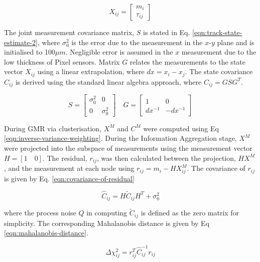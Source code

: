 \begin{equation}
X_{ij} = \begin{bmatrix} m_i \\ \tau_{ij} \end{bmatrix}
\label{eqn:track-state-estimate}
\end{equation}


The joint measurement covariance matrix, $S$ is stated in Eq. \eqref{eqn:track-state-estimate-2}, where $\sigma_0^{2}$ is the error due to the measurement in the $x$-$y$ plane and is initialised to 100$\mu m$. Negligible error is assumed in the $x$ measurement due to the low thickness of Pixel sensors. Matrix $G$ relates the measurements to the state vector $X_{ij}$ using a linear extrapolation, where $dx = x_i - x_j$. The state covariance $C_{ij}$ is derived using the standard linear algebra approach, where $C_{ij} = GSG^T$. 

\begin{equation}
S = \begin{bmatrix} \sigma_0^{2} & 0 \\ 0 & \sigma_0^{2} \end{bmatrix}  \quad G = \begin{bmatrix} 1 & 0 \\ dx^{-1} & -dx^{-1}  \end{bmatrix}
\label{eqn:track-state-estimate-2}
\end{equation}


During GMR via clusterisation, $X^{M}$ and $C^{M}$ were computed using Eq \eqref{eqn:inverse-variance-weighting}. During the Information Aggregation stage, $X^M$ were projected into the subspace of measurements using the measurement vector $H = [1 \quad 0]$. The residual, $r_{ij}$, was then calculated between the projection, $HX^M$, and the measurement at each node using $r_{ij} = m_i - HX_{ij}^M$. The covariance of $r_{ij}$ is given by Eq. \eqref{eqn:covariance-of-residual}

\begin{equation}
\hat{C}_{ij} = H \widetilde{C}_{ij} H^{T} + \sigma_{0}^{2}
\label{eqn:covariance-of-residual}
\end{equation}

where the process noise $Q$ in computing $\widetilde{C}_{ij}$ is defined as the zero matrix for simplicity. The corresponding Mahalanobis distance is given by Eq \eqref{eqn:mahalanobis-distance}.

\begin{equation}
\Delta \chi_{ij}^{2} = r_{ij}^{T} \hat{C}_{ij}^{-1} r_{ij}
\label{eqn:mahalanobis-distance}
\end{equation}

